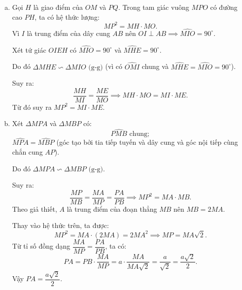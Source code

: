 \begin{bt}
{\begin{enumerate}[a)]
			Lại có $MP = MQ$ (tính chất hai tiếp tuyến cắt nhau) và $OP = OQ = R$ nên $OM$ là đường trung trực của đoạn thẳng $PQ$.
			
			Suy ra $OM \perp PQ$.
			\item Gọi $H$ là giao điểm của $OM$ và $PQ$. Trong tam giác vuông $MPO$ có đường cao $PH$, ta có hệ thức lượng:
			$$MP^2 = MH \cdot MO.$$
			Vì $I$ là trung điểm của dây cung $AB$ nên $OI \perp AB \implies \widehat{MIO} = 90^\circ$.
			
			Xét tứ giác $OIEH$ có $\widehat{MIO} = 90^\circ$ và $\widehat{MHE} = 90^\circ$.
			
			Do đó $\Delta MHE \backsim \Delta MIO\text{ (g-g)}$ (vì có $\widehat{OMI}$ chung và $\widehat{MHE} = \widehat{MIO} = 90^\circ$).
			
			Suy ra:
			$$\dfrac{MH}{MI} = \dfrac{ME}{MO} \implies MH \cdot MO = MI \cdot ME.$$
			Từ đó suy ra $MP^2 = MI \cdot ME$.
			\item Xét $\Delta MPA$ và $\Delta MBP$ có:
			$$\widehat{PMB}\text{ chung};$$
			$\widehat{MPA} = \widehat{MBP}$ (góc tạo bởi tia tiếp tuyến và dây cung và góc nội tiếp cùng chắn cung $AP$).
			
			Do đó $\Delta MPA \backsim \Delta MBP\text{ (g-g)}$.
			
			Suy ra:
			$$\dfrac{MP}{MB} = \dfrac{MA}{MP} = \dfrac{PA}{PB} \implies MP^2 = MA \cdot MB.$$
			Theo giả thiết, $A$ là trung điểm của đoạn thẳng $MB$ nên $MB = 2MA$.
			
			Thay vào hệ thức trên, ta được:
			$$MP^2 = MA \cdot (2MA) = 2MA^2 \implies MP = MA\sqrt{2}.$$
			Từ tỉ số đồng dạng $\dfrac{MA}{MP} = \dfrac{PA}{PB}$, ta có:
			$$PA = PB \cdot \dfrac{MA}{MP} = a \cdot \dfrac{MA}{MA\sqrt{2}} = \dfrac{a}{\sqrt{2}} = \dfrac{a\sqrt{2}}{2}.$$
			Vậy $PA = \dfrac{a\sqrt{2}}{2}$.
		\end{enumerate}
}
\end{bt}


